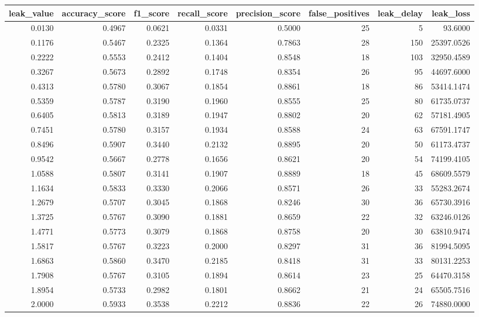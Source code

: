 \begin{tabular}{rrrrrrrr}
\toprule
leak\_value & accuracy\_score & f1\_score & recall\_score & precision\_score & false\_positives & leak\_delay & leak\_loss \\
\midrule
0.0130 & 0.4967 & 0.0621 & 0.0331 & 0.5000 & 25 & 5 & 93.6000 \\
0.1176 & 0.5467 & 0.2325 & 0.1364 & 0.7863 & 28 & 150 & 25397.0526 \\
0.2222 & 0.5553 & 0.2412 & 0.1404 & 0.8548 & 18 & 103 & 32950.4589 \\
0.3267 & 0.5673 & 0.2892 & 0.1748 & 0.8354 & 26 & 95 & 44697.6000 \\
0.4313 & 0.5780 & 0.3067 & 0.1854 & 0.8861 & 18 & 86 & 53414.1474 \\
0.5359 & 0.5787 & 0.3190 & 0.1960 & 0.8555 & 25 & 80 & 61735.0737 \\
0.6405 & 0.5813 & 0.3189 & 0.1947 & 0.8802 & 20 & 62 & 57181.4905 \\
0.7451 & 0.5780 & 0.3157 & 0.1934 & 0.8588 & 24 & 63 & 67591.1747 \\
0.8496 & 0.5907 & 0.3440 & 0.2132 & 0.8895 & 20 & 50 & 61173.4737 \\
0.9542 & 0.5667 & 0.2778 & 0.1656 & 0.8621 & 20 & 54 & 74199.4105 \\
1.0588 & 0.5807 & 0.3141 & 0.1907 & 0.8889 & 18 & 45 & 68609.5579 \\
1.1634 & 0.5833 & 0.3330 & 0.2066 & 0.8571 & 26 & 33 & 55283.2674 \\
1.2679 & 0.5707 & 0.3045 & 0.1868 & 0.8246 & 30 & 36 & 65730.3916 \\
1.3725 & 0.5767 & 0.3090 & 0.1881 & 0.8659 & 22 & 32 & 63246.0126 \\
1.4771 & 0.5773 & 0.3079 & 0.1868 & 0.8758 & 20 & 30 & 63810.9474 \\
1.5817 & 0.5767 & 0.3223 & 0.2000 & 0.8297 & 31 & 36 & 81994.5095 \\
1.6863 & 0.5860 & 0.3470 & 0.2185 & 0.8418 & 31 & 33 & 80131.2253 \\
1.7908 & 0.5767 & 0.3105 & 0.1894 & 0.8614 & 23 & 25 & 64470.3158 \\
1.8954 & 0.5733 & 0.2982 & 0.1801 & 0.8662 & 21 & 24 & 65505.7516 \\
2.0000 & 0.5933 & 0.3538 & 0.2212 & 0.8836 & 22 & 26 & 74880.0000 \\
\bottomrule
\end{tabular}
